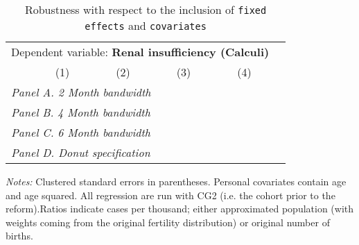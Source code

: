  \begin{table}[H] \begin{threeparttable} \centering \caption{Robustness with respect to the inclusion of \texttt{fixed effects} and \texttt{covariates}} {\def\sym#1{\ifmmode^{#1}\else\(^{#1}\)\fi} \begin{tabular}{l*{5}{c}} \toprule \multicolumn{5}{c}{Dependent variable: \textbf{Renal insufficiency (Calculi)}} \\ \cmidrule(lr){2-5}
            &\multicolumn{1}{c}{(1)}&\multicolumn{1}{c}{(2)}&\multicolumn{1}{c}{(3)}&\multicolumn{1}{c}{(4)}\\
\midrule
 \multicolumn{5}{l}{\emph{Panel A. 2 Month bandwidth}} \\    \midrule\multicolumn{5}{l}{\emph{Panel B. 4 Month bandwidth}} \\    \midrule\multicolumn{5}{l}{\emph{Panel C. 6 Month bandwidth}} \\    \midrule\multicolumn{5}{l}{\emph{Panel D. Donut specification}} \\    \midrule  
\bottomrule \end{tabular} } \begin{tablenotes} \item \scriptsize \emph{Notes:} Clustered standard errors in parentheses. Personal covariates contain age and age squared. All regression are run with CG2 (i.e. the cohort prior to the reform).Ratios indicate cases per thousand; either approximated population (with weights coming from the original fertility distribution) or original number of births. \end{tablenotes} \end{threeparttable} \end{table} 
